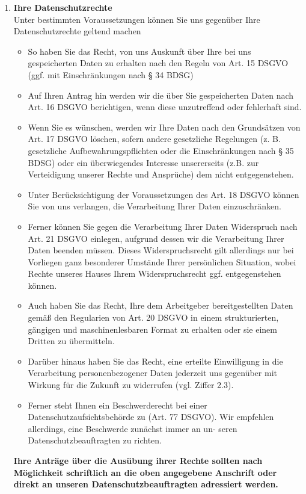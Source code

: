 \documentclass[a4paper, fontsize=11pt]{scrartcl}
\begin{document}
\begin{enumerate}[label=\textbf{\arabic*.},ref=\arabic*]
  \item \label{datenschutzrechte} \textbf{Ihre Datenschutzrechte} \\
  Unter bestimmten Voraussetzungen können Sie uns gegenüber Ihre Datenschutzrechte geltend machen
  \begin{itemize}
    \item So haben Sie das Recht, von uns Auskunft über Ihre bei uns gespeicherten Daten zu erhalten nach den Regeln von Art. 15 DSGVO (ggf. mit Einschränkungen nach § 34 BDSG)
    \item Auf Ihren Antrag hin werden wir die über Sie gespeicherten Daten nach Art. 16 DSGVO berichtigen, wenn diese unzutreffend oder fehlerhaft sind.
    \item Wenn Sie es wünschen, werden wir Ihre Daten nach den Grundsätzen von Art. 17 DSGVO löschen, sofern andere gesetzliche Regelungen (z. B. gesetzliche Aufbewahrungspflichten oder die Einschränkungen nach § 35 BDSG) oder ein überwiegendes Interesse unsererseits (z.B. zur Verteidigung unserer Rechte und Ansprüche) dem nicht entgegenstehen.
    \item Unter Berücksichtigung der Voraussetzungen des Art. 18 DSGVO können Sie von uns verlangen, die Verarbeitung Ihrer Daten einzuschränken.
    \item Ferner können Sie gegen die Verarbeitung Ihrer Daten Widerspruch nach Art. 21 DSGVO einlegen, aufgrund dessen wir die Verarbeitung Ihrer Daten beenden müssen. Dieses Widerspruchsrecht gilt allerdings nur bei Vorliegen ganz besonderer Umstände Ihrer persönlichen Situation, wobei Rechte unseres Hauses Ihrem Widerspruchsrecht ggf. entgegenstehen können.
    \item Auch haben Sie das Recht, Ihre dem Arbeitgeber bereitgestellten Daten gemäß den Regularien von Art. 20 DSGVO in einem strukturierten, gängigen und maschinenlesbaren Format zu erhalten oder sie einem Dritten zu übermitteln.
    \item Darüber hinaus haben Sie das Recht, eine erteilte Einwilligung in die Verarbeitung personenbezogener Daten jederzeit uns gegenüber mit Wirkung für die Zukunft zu widerrufen (vgl. Ziffer 2.3).
    \item Ferner steht Ihnen ein Beschwerderecht bei einer Datenschutzaufsichtsbehörde zu (Art. 77 DSGVO). Wir empfehlen allerdings, eine Beschwerde zunächst immer an un- seren Datenschutzbeauftragten zu richten.
  \end{itemize}
  \textbf{Ihre Anträge über die Ausübung ihrer Rechte sollten nach Möglichkeit schriftlich an die oben angegebene Anschrift oder direkt an unseren Datenschutzbeauftragten adressiert werden.}

\end{enumerate}
\end{document}
